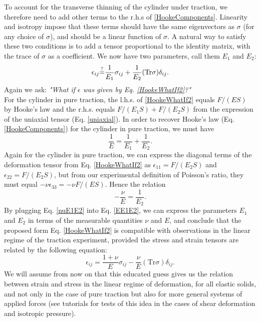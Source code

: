 \documentclass[DIV=12]{article}
\newcommand{\Tr}{\mathrm{Tr}}
\newcommand{\whatIf}{\operatornamewithlimits{=}}
\begin{document}
 To account for the transverse thinning of the cylinder under traction, we therefore
 need to add other terms to the r.h.s of \ref{HookeComponents}. Linearity 
  and isotropy impose that these terms should have the same eigenvectors
 as $\sigma$ (for any choice of $\sigma$), and should be a linear function of $\sigma$. A natural 
 way to satisfy these two conditions is to add a tensor proportional 
  to the identity matrix, with the trace of $\sigma$ as a coefficient. 
 We now have two parameters, call them $E_1$ and $E_2$:
\begin{equation}
\epsilon_{ij} {\whatIf^?} \frac{1}{E_1} \sigma_{ij} + \frac{1}{E_2} (\Tr \sigma)\delta_{ij}.
\label{HookeWhatIf2}
\end{equation}
 Again we ask:  {\emph{"What if  $\epsilon$ was given by Eq. \ref{HookeWhatIf2}?"}}\\
For the cylinder in pure traction, the l.h.s. of \ref{HookeWhatIf2} equals $F/(ES)$ by Hooke's law and the 
 r.h.s. equals $F/(E_1S) + F/(E_2S)$ from the expression of the uniaxial tensor (Eq. \ref{uniaxial}).
In order to recover Hooke's law (Eq. \ref{HookeComponents}) for the cylinder in 
pure traction, we must have
 \begin{equation}
\frac{1}{E} = \frac{1}{E_1} + \frac{1}{E_2}.
\label{EE1E2}
\end{equation}
 Again for the cylinder in pure traction, we can express the diagonal terms of the deformation tensor from Eq. \ref{HookeWhatIf2} as $\epsilon_{11} = F/(E_2S)$ and $\epsilon_{22} = F/(E_2S) $,  but from our experimental definition of Poisson's ratio, they must equal $-\nu\epsilon_{33} = -\nu F/(ES)$. Hence the relation
\begin{equation}
-\frac{\nu}{E} = \frac{1}{E_2}. 
\label{nuE1E2}
 \end{equation}
By plugging Eq. \ref{nuE1E2} into Eq. \ref{EE1E2}, we can express the parameters $E_1$ and $E_2$ in terms
 of the measurable quantities $\nu$ and $E$, and conclude that the proposed form Eq. \ref{HookeWhatIf2}
 is compatible with observations in the linear regime of the traction experiment, provided the stress and strain tensors
are related by the following equation:
\begin{equation}
\boxed{\epsilon_{ij} = \frac{1+\nu}{E} \sigma_{ij} - \frac{\nu}{E} \left( \Tr\sigma \right) \delta_{ij}}.
\label{HookeTensor}
\end{equation}
 We will assume from now on that this educated guess gives us
 the relation between strain and stress in the linear regime of deformation, 
for all elastic solids, and not only in the case of pure traction but also for more general systems of applied 
 forces (see tutorials for tests of this idea in the cases of shear deformation and isotropic pressure).
\end{document}
